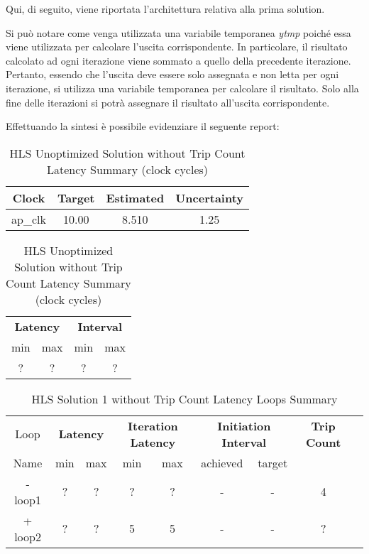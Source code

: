Qui, di seguito, viene riportata l'architettura relativa alla prima solution. 



Si può notare come venga utilizzata una variabile temporanea \textit{ytmp} poiché essa viene utilizzata per calcolare l'uscita corrispondente. In particolare, il risultato calcolato ad ogni iterazione viene sommato a quello della precedente iterazione. Pertanto, essendo che l'uscita deve essere solo assegnata e non letta per ogni iterazione, si utilizza una variabile temporanea per calcolare il risultato. Solo alla fine delle iterazioni si potrà assegnare il risultato all'uscita corrispondente. 

Effettuando la sintesi è possibile evidenziare il seguente report:\\
\begin{table}[H]
	\centering
	\begin{minipage}[t]{0.45\linewidth}
		\centering
		\begin{tabular}{|c|c|c|c|}
			\hline
			\textbf{Clock} & \textbf{Target} & \textbf{Estimated} & \textbf{Uncertainty} \\
			\hline
			ap\_clk & 10.00 & 8.510 & 1.25 \\
			\hline
		\end{tabular}
		\caption{HLS Solution 1 without Trip Count Timing Summary (ns)}
		\label{tab:hls-solution-1-timing-summary}
	\end{minipage}
	\hfill
	\begin{minipage}[t]{0.45\linewidth}
		\centering
		\begin{tabular}{|c|c|c|c|}
			\hline
			\multicolumn{2}{|c|}{\textbf{Latency}} & \multicolumn{2}{|c|}{\textbf{Interval}} \\
			min & max & min & max \\
			\hline
			? & ? & ? & ? \\
			\hline
		\end{tabular}
		\caption{HLS Unoptimized Solution without Trip Count Latency Summary (clock cycles)}
		\label{tab:hls-unoptimized-solution-latency-summary}
	\end{minipage}
\end{table}

\begin{table}[H]
	\centering
	\begin{tabular}{|c|c|c|c|c|c|c|c|c|}
		\hline
		\multicolumn{1}{|c|}{Loop} & \multicolumn{2}{|c|}{\textbf{Latency}} & \multicolumn{2}{c|}{\textbf{Iteration Latency}} & \multicolumn{2}{c|}{\textbf{Initiation Interval}} & \multicolumn{1}{c|}{\textbf{Trip Count}}  \\
		Name & min & max & min & max & achieved & target &  \\
		\hline
		- loop1 & ? & ? & ? & ? & - & - & 4 \\
		+ loop2 & ? & ? & 5 & 5 & - & - & ? \\
		\hline
	\end{tabular}
	\caption{HLS Solution 1 without Trip Count Latency Loops Summary}
	\label{tab:hls-solution-1-loop-summary}
\end{table}

